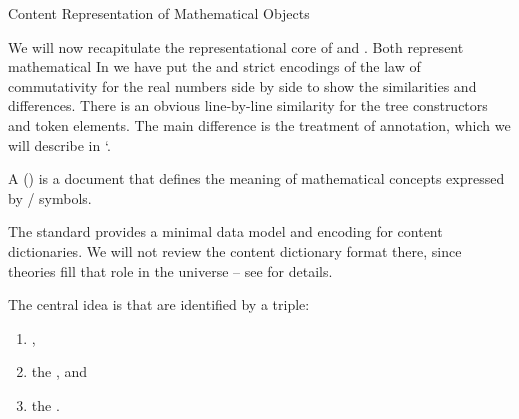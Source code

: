 \begin{omgroup}[id=mobj,short=Mathematical Objects]
\begin{omgroup}[id=mobj.core]{Content Representation of Mathematical Objects}
\begin{module}[id=mobj-core]
\begin{omtext}
We will now recapitulate the representational core of \openmath and \cmathml. Both
represent mathematical 
 In {} we have put the \openmath and strict \cmathml encodings
of the law of commutativity for the real numbers side by side to show the similarities and
differences. There is an obvious line-by-line similarity for the tree constructors and
token elements.  The main difference is the treatment of annotation, which we will
describe in `. 
\end{omtext}

\begin{definition}
  A  () is a  document
  that defines the meaning of mathematical concepts expressed by \openmath/\mathml
  symbols.
\end{definition}

The  standard provides a minimal data model and \xml encoding for content
dictionaries. We will not review the \openmath content dictionary format there, since
\omdoc theories fill that role in the \omdoc universe -- see  for
details. 

\begin{omtext}
The central idea is that  are identified by a triple: 
\begin{enumerate}
\item {},
\item the ,
  and 
\item the .
\end{enumerate}
\end{omtext}
\end{module}


\end{omgroup}
\end{omgroup}
